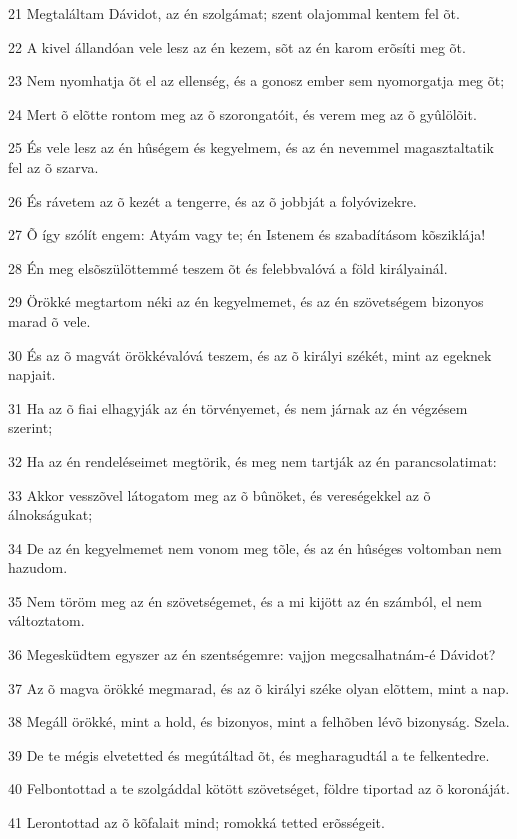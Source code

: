 \par 21 Megtaláltam Dávidot, az én szolgámat; szent olajommal kentem fel õt.
\par 22 A kivel állandóan vele lesz az én kezem, sõt az én karom erõsíti meg õt.
\par 23 Nem nyomhatja õt el az ellenség, és a gonosz ember sem nyomorgatja meg õt;
\par 24 Mert õ elõtte rontom meg az õ szorongatóit, és verem meg az õ gyûlölõit.
\par 25 És vele lesz az én hûségem és kegyelmem, és az én nevemmel magasztaltatik fel az õ szarva.
\par 26 És rávetem az õ kezét a tengerre, és az õ jobbját a folyóvizekre.
\par 27 Õ így szólít engem: Atyám vagy te; én Istenem és szabadításom kõsziklája!
\par 28 Én meg elsõszülöttemmé teszem õt és felebbvalóvá a föld királyainál.
\par 29 Örökké megtartom néki az én kegyelmemet, és az én szövetségem bizonyos marad õ vele.
\par 30 És az õ magvát örökkévalóvá teszem, és az õ királyi székét, mint az egeknek napjait.
\par 31 Ha az õ fiai elhagyják az én törvényemet, és nem járnak az én végzésem szerint;
\par 32 Ha az én rendeléseimet megtörik, és meg nem tartják az én parancsolatimat:
\par 33 Akkor vesszõvel látogatom meg az õ bûnöket, és vereségekkel az õ álnokságukat;
\par 34 De az én kegyelmemet nem vonom meg tõle, és az én hûséges voltomban nem hazudom.
\par 35 Nem töröm meg az én szövetségemet, és a mi kijött az én számból, el nem változtatom.
\par 36 Megesküdtem egyszer az én szentségemre: vajjon megcsalhatnám-é Dávidot?
\par 37 Az õ magva örökké megmarad, és az õ királyi széke olyan elõttem, mint a nap.
\par 38 Megáll örökké, mint a hold, és bizonyos, mint a felhõben lévõ bizonyság. Szela.
\par 39 De te mégis elvetetted és megútáltad õt, és megharagudtál a te felkentedre.
\par 40 Felbontottad a te szolgáddal kötött szövetséget, földre tiportad az õ koronáját.
\par 41 Lerontottad az õ kõfalait mind; romokká tetted erõsségeit.
